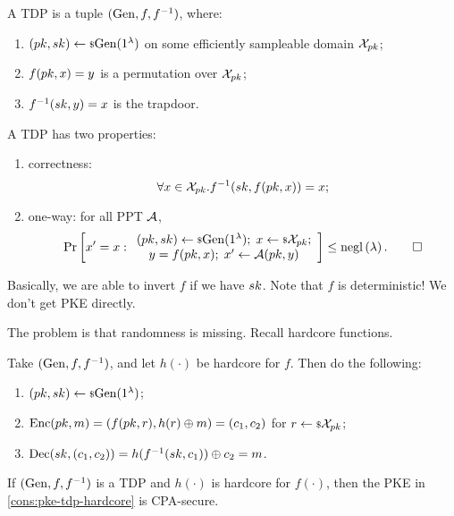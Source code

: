 \begin{definition}
	A \ac{TDP} is a tuple $(\mathrm{Gen}, f, f^{-1})$, where:
	\begin{enumerate}
		\item $(pk, sk) \leftarrow {\scriptstyle \$} {\mathrm{Gen}(1^{\lambda})}$ on some efficiently sampleable domain $\mathcal{X}_{pk}$;
		\item $f(pk, x) = y$ is a permutation over $\mathcal{X}_{pk}$;
		\item $f^{-1}(sk, y) = x$ is the trapdoor.
	\end{enumerate}
	A \ac{TDP} has two properties:
	\begin{enumerate}
		\item correctness:
			\begin{equation*}
				\forall x \in \mathcal{X}_{pk} . f^{-1}(sk, f(pk, x)) = x;
			\end{equation*}
		\item one-way: for all \ac{PPT} $\mathcal{A}$,
			\begin{equation*}
				\mathop{\mathrm{Pr}}\limits_{} \left[ {
					x' = x :
					\begin{array}{c}
					(pk, sk) \leftarrow {\scriptstyle \$} {\mathrm{Gen}(1^{\lambda})}; \;
					x \leftarrow {\scriptstyle \$} {\mathcal{X}_{pk}}; \\
					y = f(pk, x); \;
					x' \leftarrow \mathcal{A}(pk, y)
					\end{array}
				} \right]
				\le \mathrm{negl}\left({\lambda}\right).
				\qedhere
			\end{equation*}
	\end{enumerate}
\end{definition}
Basically, we are able to invert $f$ if we have $sk$.
Note that $f$ is deterministic!
We don't get \ac{PKE} directly.

The problem is that randomness is missing.
Recall hardcore functions.
\begin{construction} \label{cons:pke-tdp-hardcore}
	Take $(\mathrm{Gen}, f, f^{-1})$, and let $h(\cdot)$ be hardcore for $f$.
	Then do the following:
	\begin{enumerate}
		\item $(pk, sk) \leftarrow {\scriptstyle \$} {\mathrm{Gen}(1^{\lambda})}$;
		\item $\mathrm{Enc}(pk, m) = (f(pk, r), h(r) \oplus m) = (c_1, c_2)$ for $r \leftarrow {\scriptstyle \$} {\mathcal{X}_{pk}}$;
		\item $\mathrm{Dec}(sk, (c_1, c_2)) = h(f^{-1}(sk, c_1)) \oplus c_2 = m$.
	\end{enumerate}
\end{construction}

\begin{theorem}
	If $(\mathrm{Gen}, f, f^{-1})$ is a \ac{TDP} and $h(\cdot)$ is hardcore for $f(\cdot)$, then the \ac{PKE} in \cref{cons:pke-tdp-hardcore} is \ac{CPA}-secure.
\end{theorem}

